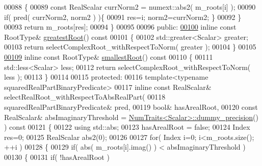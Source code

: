 \begin{DoxyCode}
00088       \{
00089         \textcolor{keyword}{const} RealScalar currNorm2 = numext::abs2( m\_roots[i] );
00090         \textcolor{keywordflow}{if}( pred( currNorm2, norm2 ) )\{
00091           res=i; norm2=currNorm2; \}
00092       \}
00093       \textcolor{keywordflow}{return} m\_roots[res];
00094     \}
00095 
00096   \textcolor{keyword}{public}:
\hyperlink{class_eigen_1_1_polynomial_solver_base_a0327769cc88877a79c7c838f03d78384}{00100}     \textcolor{keyword}{inline} \textcolor{keyword}{const} RootType& \hyperlink{class_eigen_1_1_polynomial_solver_base_a0327769cc88877a79c7c838f03d78384}{greatestRoot}()\textcolor{keyword}{ const}
00101 \textcolor{keyword}{    }\{
00102       std::greater<Scalar> greater;
00103       \textcolor{keywordflow}{return} selectComplexRoot\_withRespectToNorm( greater );
00104     \}
00105 
\hyperlink{class_eigen_1_1_polynomial_solver_base_a64389d0acf586c772fb3d1db47a3f7ef}{00109}     \textcolor{keyword}{inline} \textcolor{keyword}{const} RootType& \hyperlink{class_eigen_1_1_polynomial_solver_base_a64389d0acf586c772fb3d1db47a3f7ef}{smallestRoot}()\textcolor{keyword}{ const}
00110 \textcolor{keyword}{    }\{
00111       std::less<Scalar> less;
00112       \textcolor{keywordflow}{return} selectComplexRoot\_withRespectToNorm( less );
00113     \}
00114 
00115   \textcolor{keyword}{protected}:
00116     \textcolor{keyword}{template}<\textcolor{keyword}{typename} squaredRealPartBinaryPredicate>
00117     \textcolor{keyword}{inline} \textcolor{keyword}{const} RealScalar& selectRealRoot\_withRespectToAbsRealPart(
00118         squaredRealPartBinaryPredicate& pred,
00119         \textcolor{keywordtype}{bool}& hasArealRoot,
00120         \textcolor{keyword}{const} RealScalar& absImaginaryThreshold = 
      \hyperlink{group___core___module_struct_eigen_1_1_num_traits}{NumTraits<Scalar>::dummy\_precision}() )\textcolor{keyword}{ const}
00121 \textcolor{keyword}{    }\{
00122       \textcolor{keyword}{using} std::abs;
00123       hasArealRoot = \textcolor{keyword}{false};
00124       Index res=0;
00125       RealScalar abs2(0);
00126 
00127       \textcolor{keywordflow}{for}( Index i=0; i<m\_roots.size(); ++i )
00128       \{
00129         \textcolor{keywordflow}{if}( abs( m\_roots[i].imag() ) < absImaginaryThreshold )
00130         \{
00131           \textcolor{keywordflow}{if}( !hasArealRoot )

\end{DoxyCode}
